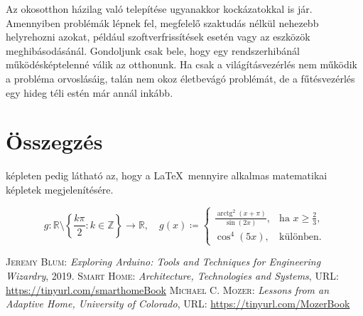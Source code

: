 \documentclass{thesis-ekf}
\theoremstyle{definition}
\DeclareMathOperator{\arctg}{arctg}
\begin{document}
Az okosotthon házilag való telepítése ugyanakkor kockázatokkal is jár. Amennyiben problémák lépnek fel, megfelelő szaktudás nélkül nehezebb helyrehozni azokat, például szoftverfrissítések esetén vagy az eszközök meghibásodásánál. Gondoljunk csak bele, hogy egy rendszerhibánál működésképtelenné válik az otthonunk. Ha csak a világításvezérlés nem működik a probléma orvoslásáig, talán nem okoz életbevágó problémát, de a fűtésvezérlés egy hideg téli estén már annál inkább.


\chapter*{Összegzés}
 \Az{\eqref{matKeplet}} képleten pedig látható az, hogy a \LaTeX~mennyire alkalmas matematikai  képletek megjelenítésére.
 
\begin{equation}\label{matKeplet}
	g\colon \mathbb{R} \setminus \left\{\frac{k\pi}{2}:k\in \mathbb{Z}\right\}\rightarrow \mathbb{R},\quad g(x)\coloneq
	\begin{cases}
		\frac{\arctg^2(x+\pi)}{\sin(2x)},&\text{ha }x\geq\frac{2}{3},\\
		\cos^4(5x), &\text{különben.}
	\end{cases}
\end{equation}



\begin{thebibliography}{3}
\textsc{Jeremy Blum}: \emph{Exploring Arduino: Tools and Techniques for Engineering Wizardry}, 2019.
\textsc{Smart Home:} \emph{Architecture, Technologies and Systems},
\textsc{URL:} \url{https://tinyurl.com/smarthomeBook}
\textsc{Michael C. Mozer:} \emph{Lessons from an Adaptive Home, University of Colorado},
\textsc{URL:} \url{ https://tinyurl.com/MozerBook}
\end{thebibliography}
\end{document}
